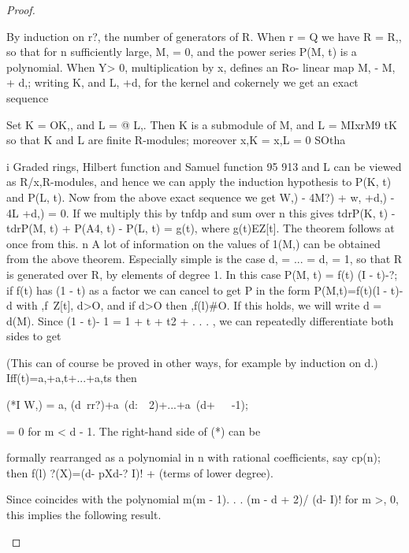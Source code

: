 \begin{proof}
\begin{mathematicalrecord}
By induction on r?, the number of generators of R. When r = Q we
have R = R,, so that for n sufficiently large, M, = 0, and the power series
P(M, t) is a polynomial. When Y> 0, multiplication       by x, defines an Ro-
linear map M, - M, + d,; writing K, and L, +d,   for the kernel and cokernely
we get an exact sequence



Set K = OK,, and L = @ L,. Then K is a submodule of M, and L = MIxrM9
                                                                   tK
so that K and L are finite R-modules; moreover x,K = x,L = 0 SOtha

                                                                                 i
Graded rings, Hilbert function       and Samuel function                     95
913
and L can be viewed as R/x,R-modules,      and hence we can apply the
induction hypothesis to P(K, t) and P(L, t). Now from the above exact
sequence we get
        W,) - 4M?) + w, +d,) - 4L +d,) = 0.
If we multiply this by tnfdp and sum over n this gives
          tdrP(K, t) - tdrP(M, t) + P(A4, t) - P(L, t) = g(t),
where g(t)EZ[t].    The theorem follows at once from this. n
   A lot of information on the values of 1(M,) can be obtained from the
above theorem. Especially simple is the case d, = ... = d, = 1, so that R is
generated over R, by elements of degree 1. In this case P(M, t) = f(t)
(I - t)-?; if f(t) has (1 - t) as a factor we can cancel to get P in the form
          P(M,t)=f(t)(l        - t)-d with     ,f~Z[t],         d>O,
          and if d>O           then ,f(l)#O.
If this holds, we will write d = d(M). Since (1 - t)- 1 = 1 + t + t2 + . . . , we
can repeatedly differentiate both sides to get



(This can of course be proved in other ways, for example by induction on d.)
Iff(t)=a,+a,t+...+a,ts        then


(*I      W,) = a, (d~rr?)+a~(d:~~2)+...+a~(d+~~~-1);


                          = 0 for m < d - 1. The right-hand            side of (*) can be

formally rearranged as a polynomial        in n with rational coefficients, say cp(n);
then
                    f(l)
          ?(X)=(d- pXd-? I)!        + (terms of lower degree).

Since              coincides     with   the polynomial          m(m - 1). . . (m - d + 2)/
(d-   I)! for m >, 0, this implies the following      result.
\end{mathematicalrecord}
\end{proof}


